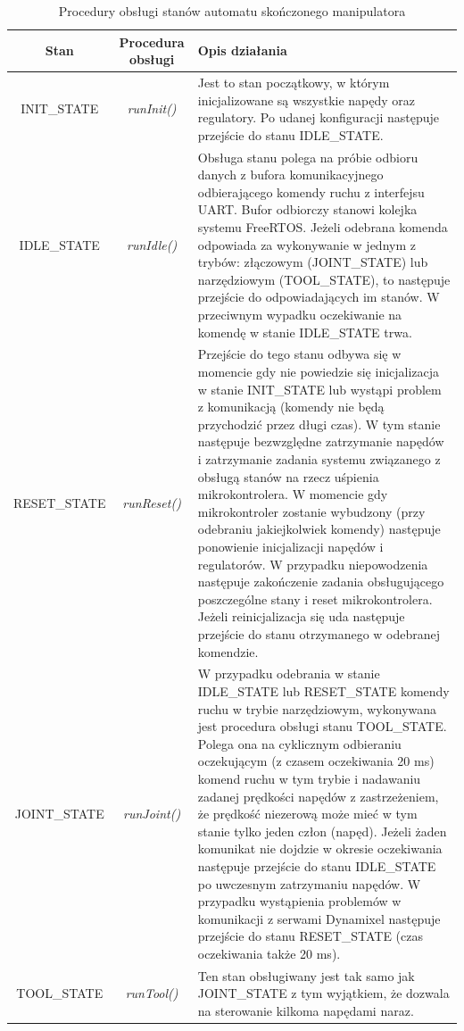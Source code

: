 \documentclass[a4paper, 12pt, twoside]{article}
\begin{document}
\begin{table}[htb!]
\label{handlers}
\begin{center}
\caption{Procedury obsługi stanów automatu skończonego manipulatora}
\begin{tabular}{ | c | c | p{9.5cm} |}
\hline
 \textbf{Stan} & \textbf{Procedura obsługi} & \textbf{Opis działania} \\ 
\hline
 INIT\_STATE & \textit{runInit()} & Jest to stan początkowy, w którym inicjalizowane są wszystkie napędy oraz regulatory. Po udanej konfiguracji następuje przejście do stanu IDLE\_STATE.\\
\hline
 IDLE\_STATE & \textit{runIdle()} & Obsługa stanu polega na próbie odbioru danych z bufora komunikacyjnego odbierającego komendy ruchu z interfejsu UART. Bufor odbiorczy stanowi kolejka systemu FreeRTOS. Jeżeli odebrana komenda odpowiada za wykonywanie w jednym z trybów: złączowym (JOINT\_STATE) lub narzędziowym (TOOL\_STATE), to następuje przejście do odpowiadających im stanów. W przeciwnym wypadku oczekiwanie na komendę w stanie IDLE\_STATE trwa. \\
\hline
 RESET\_STATE & \textit{runReset()} & Przejście do tego stanu odbywa się w momencie gdy nie powiedzie się inicjalizacja w stanie INIT\_STATE lub wystąpi problem z komunikacją (komendy nie będą przychodzić przez długi czas). W tym stanie następuje bezwzględne zatrzymanie napędów i zatrzymanie zadania systemu związanego z obsługą stanów na rzecz uśpienia mikrokontrolera. W momencie gdy mikrokontroler zostanie wybudzony (przy odebraniu jakiejkolwiek komendy) następuje ponowienie inicjalizacji napędów i regulatorów. W przypadku niepowodzenia następuje zakończenie zadania obsługującego poszczególne stany i reset mikrokontrolera. Jeżeli reinicjalizacja się uda następuje przejście do stanu otrzymanego w odebranej komendzie.\\
\hline
 JOINT\_STATE & \textit{runJoint()} & W przypadku odebrania w stanie IDLE\_STATE lub RESET\_STATE komendy ruchu w trybie narzędziowym, wykonywana jest procedura obsługi stanu TOOL\_STATE. Polega ona na cyklicznym odbieraniu oczekującym (z czasem oczekiwania 20 ms) komend ruchu w tym trybie i nadawaniu zadanej prędkości napędów z zastrzeżeniem, że prędkość niezerową może mieć w tym stanie tylko jeden człon (napęd). Jeżeli żaden komunikat nie dojdzie w okresie oczekiwania następuje przejście do stanu IDLE\_STATE po uwczesnym zatrzymaniu napędów. W przypadku wystąpienia problemów w komunikacji z serwami Dynamixel następuje przejście do stanu RESET\_STATE (czas oczekiwania także 20 ms). \\
\hline
 TOOL\_STATE & \textit{runTool()} & Ten stan obsługiwany jest tak samo jak JOINT\_STATE z tym wyjątkiem, że dozwala na sterowanie kilkoma napędami naraz. \\
\hline
\end{tabular}
\end{center}
\end{table}
\end{document}
